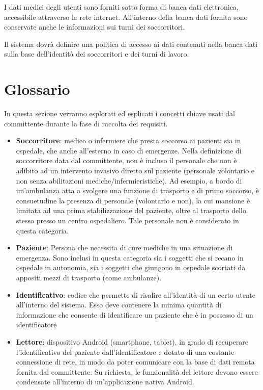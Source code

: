 \documentclass[a4paper,12pt]{report}
\begin{document}
I dati medici degli utenti sono forniti sotto forma di banca dati elettronica, accessibile attraverso la rete internet. All'interno della banca dati fornita sono conservate anche le informazioni sui turni dei soccorritori. 

Il sistema dovrà definire una politica di accesso ai dati contenuti nella banca dati sulla base dell'identità dei soccorritori e dei turni di lavoro. 

\section{Glossario}
In questa sezione verranno esplorati ed esplicati i concetti chiave usati dal committente durante la fase di raccolta dei requisiti. 
\begin{itemize}
	\item \textbf{Soccorritore}: medico o infermiere che presta soccorso ai pazienti sia in ospedale, che anche all'esterno in caso di emergenze. Nella definizione di soccorritore data dal committente, non è incluso il personale che non è adibito ad un intervento invasivo diretto sul paziente (personale volontario e non senza abilitazioni mediche/infermieristiche). Ad esempio, a bordo di un'ambulanza atta a svolgere una funzione di trasporto e di primo soccorso, è consuetudine la presenza di personale (volontario e non), la cui mansione è limitata ad una prima stabilizzazione del paziente, oltre al trasporto dello stesso presso un centro ospedaliero. Tale personale non è considerato in questa categoria.
	\item \textbf{Paziente}: Persona che necessita di cure mediche in una situazione di emergenza. Sono inclusi in questa categoria sia i soggetti che si recano in ospedale in autonomia, sia i soggetti che giungono in ospedale scortati da appositi mezzi di trasporto (come ambulanze).
	\item \textbf{Identificativo}: codice che permette di risalire all'identità di un certo utente all'interno del sistema. Esso deve contenere la minima quantità di informazione che consente di identificare un paziente che è in possesso di un identificatore
	\item \textbf{Lettore}: dispositivo Android (smartphone, tablet), in grado di recuperare l'identificativo del paziente dall'identificatore e dotato di una costante connessione di rete, in modo da poter comunicare con la base di dati remota fornita dal committente. Su richiesta, le funzionalità del lettore devono essere condensate all'interno di un'applicazione nativa Android.

\end{itemize}
\end{document}
